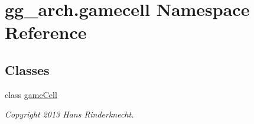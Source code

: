 \hypertarget{namespacegg__arch_1_1gamecell}{\section{gg\-\_\-arch.\-gamecell Namespace Reference}
\label{namespacegg__arch_1_1gamecell}
}
\subsection*{Classes}
\begin{DoxyCompactItemize}
\item 
class \hyperlink{classgg__arch_1_1gamecell_1_1game_cell}{game\-Cell}
\begin{DoxyCompactList}\small\item\em Copyright 2013 Hans Rinderknecht. \end{DoxyCompactList}\end{DoxyCompactItemize}
